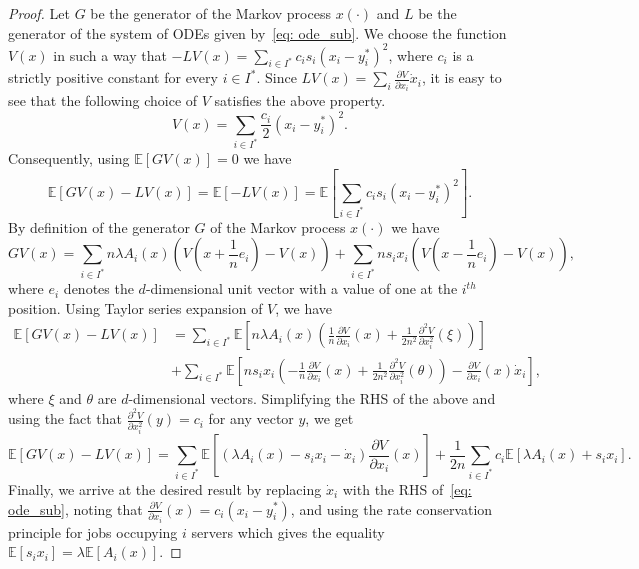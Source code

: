 \documentclass[a4paper]{article}
\theoremstyle{plain}
\theoremstyle{definition}
\theoremstyle{case}
\theoremstyle{remark}
\newcommand{\brac}[1]{\left(#1\right)}
\newcommand{\sbrac}[1]{\left[#1\right]}
\newcommand{\expect}[1]{\mathbb{E}\sbrac{#1}}
\begin{document}
\begin{proof}
Let $G$ be the generator of the Markov process $x(\cdot)$ and $L$ be the generator of the system of ODEs given by~\eqref{eq: ode_sub}. We choose the function $V(x)$ in such a way that $-LV(x) = \sum_{i \in I^*} c_i s_i \brac{x_i - y_i^*}^2$, where $c_i$ is a strictly positive constant for every $i \in I^*$. 
Since $LV(x)=\sum_i \frac{\partial V}{\partial x_i} \dot x_i$, it is easy to see that the following choice of $V$ satisfies the above property.
%
\begin{equation}
    V(x)=\sum_{i \in I^*}\frac{c_i}{2}\brac{x_i - y_i^*}^2.
\end{equation}
%
Consequently, using $\mathbb{E}[GV(x)]=0$ we have
%
\begin{equation}
    \expect{GV(x) - LV(x)} = \expect{-LV(x)}= \expect{\sum_{i \in I^*} c_i s_i \brac{x_i - y_i^*}^2}.
\end{equation}
%
By definition of the generator $G$ of the Markov process $x(\cdot)$ we have
%
\begin{equation}\label{eq: drift G_sub}
GV(x)=\sum_{i \in I^*} n\lambda A_i(x)\brac{V\brac{x+\frac{1}{n}e_i}-V\brac{x}}
+\sum_{i \in I^*}ns_ix_i\brac{V\brac{x-\frac{1}{n}e_i}-V\brac{x}},
\end{equation}
%
where $e_i$ denotes the $d$-dimensional unit vector with a value of one at the $i^{th}$ position. Using Taylor series expansion of $V$, %
we have
%
\begin{align}
\expect{GV(x)-LV(x)}
&=\sum_{i \in I^*}\expect{n\lambda A_i(x)\brac{\frac{1}{n}\frac{\partial V}{\partial x_i}(x)+\frac{1}{2n^2}\frac{\partial^2 V}{\partial x_i^2}(\xi)}}\nonumber
\\&+\sum_{i \in I^*} \expect{ns_i x_i\brac{-\frac{1}{n}\frac{\partial V}{\partial x_i}(x)+\frac{1}{2n^2}\frac{\partial^2 V}{\partial x_i^2}(\theta)}-\frac{\partial V}{\partial x_i}(x)\dot{x}_i},
\end{align}
%
where $\xi$ and $\theta$ are $d$-dimensional vectors. 
Simplifying the RHS of the above and using the fact that $\frac{\partial^2 V}{\partial x_i^2}(y) = c_i$ for any vector $y$, we get
%
\begin{equation}
\mathbb{E}[GV(x)-LV(x)]=
\sum_{i \in I^*}\expect{\brac{\lambda A_i(x)-s_ix_i- \dot{x}_i}\frac{\partial V}{\partial x_i}(x)}
+\frac{1}{2n}\sum_{ i \in I^*} c_i\expect{\lambda A_i(x)+s_ix_i}.
\end{equation}
%
Finally, we arrive at the desired result by replacing $\dot x_i$ with the RHS of~\eqref{eq: ode_sub}, noting that $\frac{\partial V}{\partial x_i}(x) = c_i \brac{x_i - y_i^*}$, and using the rate conservation principle for jobs occupying $i$ servers which gives the equality $\expect{s_ix_i} = \lambda \expect{A_i(x)}$. 
\end{proof}
\end{document}
